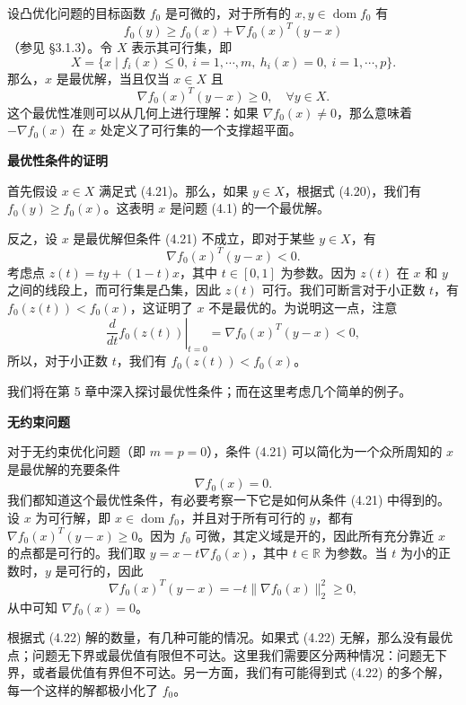 \documentclass[UTF8,12pt,a4paper,fontset=fandol]{ctexart}
\begin{document}
设凸优化问题的目标函数 $f_0$ 是可微的，对于所有的 $x,y\in\operatorname{dom} f_0$ 有
\begin{equation}
f_0(y)\geq f_0(x)+\nabla f_0(x)^T(y-x)
\tag{4.20}
\end{equation}
（参见 §3.1.3）。令 $X$ 表示其可行集，即
\[
X=\{x\mid f_i(x)\leq 0,\ i=1,\cdots,m,\ h_i(x)=0,\ i=1,\cdots,p\}.
\]
那么，$x$ 是最优解，当且仅当 $x\in X$ 且
\begin{equation}
\nabla f_0(x)^T(y-x)\geq 0,\quad \forall y\in X.
\tag{4.21}
\end{equation}
这个最优性准则可以从几何上进行理解：如果 $\nabla f_0(x)\neq 0$，那么意味着 $-\nabla f_0(x)$ 在 $x$ 处定义了可行集的一个支撑超平面。

\noindent\textbf{最优性条件的证明}

首先假设 $x\in X$ 满足式 (4.21)。那么，如果 $y\in X$，根据式 (4.20)，我们有 $f_0(y)\geq f_0(x)$。这表明 $x$ 是问题 (4.1) 的一个最优解。

反之，设 $x$ 是最优解但条件 (4.21) 不成立，即对于某些 $y\in X$，有
\[
\nabla f_0(x)^T(y-x)<0.
\]
考虑点 $z(t)=ty+(1-t)x$，其中 $t\in[0,1]$ 为参数。因为 $z(t)$ 在 $x$ 和 $y$ 之间的线段上，而可行集是凸集，因此 $z(t)$ 可行。我们可断言对于小正数 $t$，有 $f_0(z(t))<f_0(x)$，这证明了 $x$ 不是最优的。为说明这一点，注意
\[
\left.\frac{d}{dt}f_0(z(t))\right|_{t=0}
=\nabla f_0(x)^T(y-x)<0,
\]
所以，对于小正数 $t$，我们有 $f_0(z(t))<f_0(x)$。

我们将在第 5 章中深入探讨最优性条件；而在这里考虑几个简单的例子。

\noindent\textbf{无约束问题}

对于无约束优化问题（即 $m=p=0$），条件 (4.21) 可以简化为一个众所周知的 $x$ 是最优解的充要条件
\begin{equation}
\nabla f_0(x)=0.
\tag{4.22}
\end{equation}
我们都知道这个最优性条件，有必要考察一下它是如何从条件 (4.21) 中得到的。设 $x$ 为可行解，即 $x\in\operatorname{dom} f_0$，并且对于所有可行的 $y$，都有 $\nabla f_0(x)^T(y-x)\geq 0$。因为 $f_0$ 可微，其定义域是开的，因此所有充分靠近 $x$ 的点都是可行的。我们取 $y=x-t\nabla f_0(x)$，其中 $t\in\mathbb{R}$ 为参数。当 $t$ 为小的正数时，$y$ 是可行的，因此
\[
\nabla f_0(x)^T(y-x)=-t\|\nabla f_0(x)\|_2^2\geq 0,
\]
从中可知 $\nabla f_0(x)=0$。

根据式 (4.22) 解的数量，有几种可能的情况。如果式 (4.22) 无解，那么没有最优点；问题无下界或最优值有限但不可达。这里我们需要区分两种情况：问题无下界，或者最优值有界但不可达。另一方面，我们有可能得到式 (4.22) 的多个解，每一个这样的解都极小化了 $f_0$。
\end{document}
